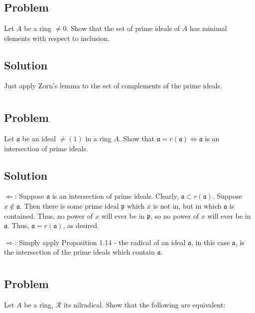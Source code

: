 \documentclass[book,12pt,oneside,openany]{memoir}
\begin{document}
\section{}
\subsection{Problem}
Let $A$ be a ring $\neq 0$. Show that the set of prime ideals of $A$ has minimal elements with respect to inclusion.
\subsection{Solution}
Just apply Zorn's lemma to the set of complements of the prime ideals.

\section{}
\subsection{Problem}
Let $\mathfrak{a}$ be an ideal $\neq (1)$ in a ring $A$. Show that $\mathfrak{a} = r(\mathfrak{a}) \Leftrightarrow \mathfrak{a}$ is an intersection of prime ideals.
\subsection{Solution}

$\Leftarrow$: Suppose $\mathfrak{a}$ is an intersection of prime ideals. Clearly, $\mathfrak{a} \subset r(\mathfrak{a})$. Suppose $x \notin \mathfrak{a}$. Then there is some prime ideal $\mathfrak{p}$ which $x$ is not in, but in which $\mathfrak{a}$ is contained. Thus, no power of $x$ will ever be in $\mathfrak{p}$, so no power of $x$ will ever be in $\mathfrak{a}$. Thus, $\mathfrak{a} = r(\mathfrak{a})$, as desired.

$\Rightarrow$:  Simply apply Proposition 1.14 - the radical of an ideal $\mathfrak{a}$, in this case $\mathfrak{a}$, is the intersection of the prime ideals which contain $\mathfrak{a}$.
\section{}
\subsection{Problem}
Let $A$ be a ring, $\mathcal{R}$ its nilradical. Show that the following are equivalent:
\end{document}
